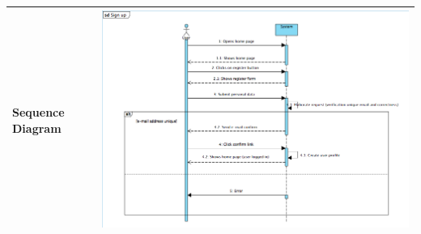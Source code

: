 \documentclass[12pt]{book}
\begin{document}
\begin{center}
\begin{tabular}{ |l|l| }
		Sequence Diagram &  \includegraphics[scale=0.5]{SignUpSD}\\
		\hline
  		\hline
\end{tabular} \\
\vspace*{\fill}
\end{center}
\end{document}
